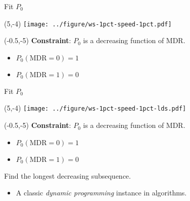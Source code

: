 \documentclass[aspectratio=169]{beamer}
\begin{document}
\begin{frame}{Fit $P_0$}
\begin{textblock}{1}(5,-4)
\texttt{[image: ../figure/ws-1pct-speed-1pct.pdf]}
\end{textblock}

\begin{textblock}{5}(-0.5,-5)
\textbf{Constraint}: $P_0$ is a decreasing function of MDR. 
\begin{itemize}
\item $P_0(\text{MDR}=0) = 1$

\item $P_0(\text{MDR}=1) = 0$
\end{itemize}
\end{textblock}
\end{frame}


\begin{frame}{Fit $P_0$} 
\begin{textblock}{1}(5,-4)
\texttt{[image: ../figure/ws-1pct-speed-1pct-lds.pdf]}
\end{textblock}

\begin{textblock}{5}(-0.5,-5)
\textbf{Constraint}: $P_0$ is a decreasing function of MDR. 
\begin{itemize}
\item $P_0(\text{MDR}=0) = 1$

\item $P_0(\text{MDR}=1) = 0$
\end{itemize}\medskip

Find the longest decreasing subsequence.
\begin{itemize}
\item A classic \textit{dynamic programming} instance in algorithms.
\end{itemize}

\end{textblock}
\end{frame}
\end{document}

